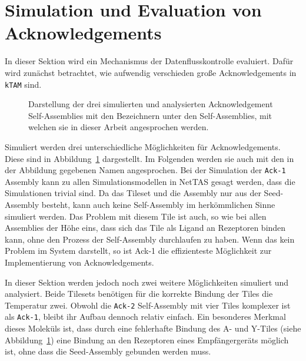 \section{Simulation und Evaluation von Acknowledgements}
\label{sec:eval_ack}

In dieser Sektion wird ein Mechanismus der Datenflusskontrolle evaluiert. Dafür wird zunächst betrachtet, wie aufwendig verschieden große Acknowledgements in \texttt{kTAM} sind. 

\begin{figure}
    \centering 
    \caption[Acknowledgement Assemblies]{Darstellung der drei simulierten und analysierten Acknowledgement Self-Assemblies mit den Bezeichnern unter den Self-Assemblies, mit welchen sie in dieser Arbeit angesprochen werden.}
    \label{fig:ack_assemblies}
\end{figure}

Simuliert werden drei unterschiedliche Möglichkeiten für Acknowledgements. Diese sind in Abbildung~\ref{fig:ack_assemblies} dargestellt. Im Folgenden werden sie auch mit den in der Abbildung gegebenen Namen angesprochen. Bei der Simulation der \texttt{Ack-1} Assembly kann zu allen Simulationsmodellen in NetTAS gesagt werden, dass die Simulationen trivial sind. Da das Tileset und die Assembly nur aus der Seed-Assembly besteht, kann auch keine Self-Assembly im herkömmlichen Sinne simuliert werden. Das Problem mit diesem Tile ist auch, so wie bei allen Assemblies der Höhe eins, dass sich das Tile als Ligand an Rezeptoren binden kann, ohne den Prozess der Self-Assembly durchlaufen zu haben. Wenn das kein Problem im System darstellt, so ist Ack-1 die effizienteste Möglichkeit zur Implementierung von Acknowledgements. 

In dieser Sektion werden jedoch noch zwei weitere Möglichkeiten simuliert und analysiert. Beide Tilesets benötigen für die korrekte Bindung der Tiles die Temperatur zwei. Obwohl die \texttt{Ack-2} Self-Assembly mit vier Tiles komplexer ist als \texttt{Ack-1}, bleibt ihr Aufbau dennoch relativ einfach. Ein besonderes Merkmal dieses Moleküls ist, dass durch eine fehlerhafte Bindung des A- und Y-Tiles (siehe Abbildung~\ref{fig:ack_assemblies}) eine Bindung an den Rezeptoren eines Empfängergeräts möglich ist, ohne dass die Seed-Assembly gebunden werden muss.

